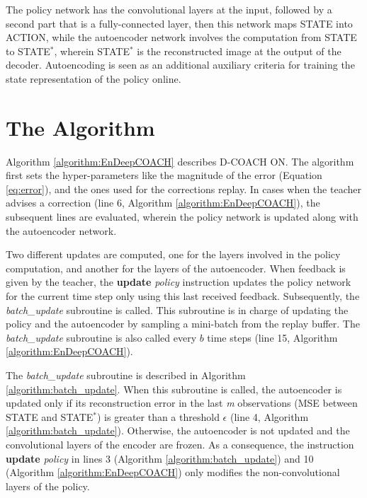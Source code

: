 The policy network has the convolutional layers at the input, followed by a second part that is a fully-connected layer, then this network maps STATE into ACTION, while the autoencoder network involves the computation from STATE to STATE$^{*}$, wherein  STATE$^{*}$ is the reconstructed image at the output of the decoder. Autoencoding is seen as an additional auxiliary criteria for training the state representation of the policy online. 


\section{The Algorithm}
Algorithm \ref{algorithm:EnDeepCOACH} describes D-COACH ON. The algorithm first sets the hyper-parameters like the magnitude of the error (Equation \ref{eq:error}), and the ones used for the corrections replay. In cases when the teacher advises a correction (line 6, Algorithm \ref{algorithm:EnDeepCOACH}), the subsequent lines are evaluated, wherein the policy network is updated along with the autoencoder network.

Two different updates are computed, one for the layers involved in the policy computation, and another for the layers of the autoencoder. When feedback is given by the teacher, the \textbf{update} \emph{policy} instruction updates the policy network for the current time step only using this last received feedback. Subsequently, the \emph{batch\_update} subroutine is called. This subroutine is in charge of updating the policy and the autoencoder by sampling a mini-batch from the replay buffer. The \emph{batch\_update} subroutine is also called every $b$ time steps (line 15, Algorithm \ref{algorithm:EnDeepCOACH}).

The \emph{batch\_update} subroutine is described in Algorithm \ref{algorithm:batch_update}. When this subroutine is called, the autoencoder is updated only if its reconstruction error in the last \emph{m} observations (MSE between STATE and STATE$^{*}$) is greater than a threshold $\epsilon$ (line 4, Algorithm \ref{algorithm:batch_update}). Otherwise, the autoencoder is not updated and the convolutional layers of the encoder are frozen. As a consequence, the instruction \textbf{update} \emph{policy} in lines 3 (Algorithm \ref{algorithm:batch_update}) and 10 (Algorithm \ref{algorithm:EnDeepCOACH}) only modifies the non-convolutional layers of the policy. 

